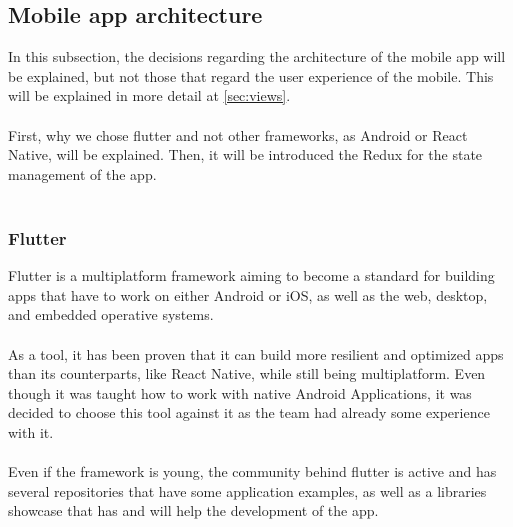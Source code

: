 \documentclass[./main.tex]{subfiles}
\begin{document}
	\subsection{Mobile app architecture}
	In this subsection, the decisions regarding the architecture of the mobile app will
	be explained, but not those that regard the user experience of the mobile. This 
	will be explained in more detail at  \ref{sec:views}.\\
	\\
	First, why we chose flutter and not other frameworks, as Android or React Native,
	will be explained. Then, it will be introduced the Redux for the state management
	of the app.\\
	\\
	\subsubsection{Flutter}
	Flutter is a multiplatform framework aiming to become a standard for building apps that have to work on either Android or iOS, as well as the web, desktop, and embedded operative systems. \\
	\\
	As a tool, it has been proven that it can build more resilient and optimized apps than its counterparts, like React Native, while still being multiplatform. Even though it was taught how to work with native Android Applications, it was decided to choose this tool against it as the team had already some experience with it.\\
	\\
	Even if the framework is young, the community behind flutter is active and has several repositories that have some application examples, as well as a libraries showcase that has and will help the development of the app.
\end{document}
